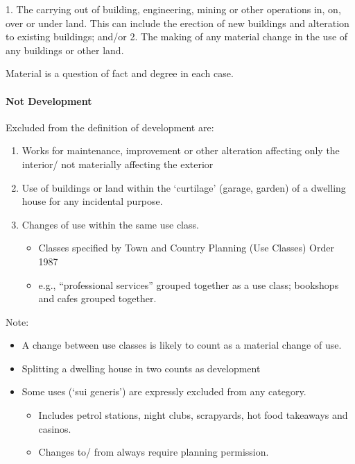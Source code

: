 \documentclass[
]{article}
\newenvironment{Shaded}{}{}
\newcommand{\NormalTok}[1]{#1}
\providecommand{\tightlist}{%
  \setlength{\itemsep}{0pt}\setlength{\parskip}{0pt}}
\begin{document}
\begin{Shaded}
\begin{Highlighting}[]
\NormalTok{1. The carrying out of building, engineering, mining or other operations in, on, over or under land. This can include the erection of new buildings and alteration to existing buildings; and/or}
\NormalTok{2. The making of any material change in the use of any buildings or other land.}
\end{Highlighting}
\end{Shaded}

Material is a question of fact and degree in each case.

\hypertarget{not-development}{%
\paragraph{Not Development}\label{not-development}}

Excluded from the definition of development are:

\begin{enumerate}
\def\labelenumi{\arabic{enumi}.}
\tightlist
\item
  Works for maintenance, improvement or other alteration affecting only
  the interior/ not materially affecting the exterior
\item
  Use of buildings or land within the `curtilage' (garage, garden) of a
  dwelling house for any incidental purpose.
\item
  Changes of use within the same use class.

  \begin{itemize}
  \tightlist
  \item
    Classes specified by Town and Country Planning (Use Classes) Order
    1987
  \item
    e.g., ``professional services'' grouped together as a use class;
    bookshops and cafes grouped together.
  \end{itemize}
\end{enumerate}

Note:

\begin{itemize}
\tightlist
\item
  A change between use classes is likely to count as a material change
  of use.
\item
  Splitting a dwelling house in two counts as development
\item
  Some uses (`sui generis') are expressly excluded from any category.

  \begin{itemize}
  \tightlist
  \item
    Includes petrol stations, night clubs, scrapyards, hot food
    takeaways and casinos.
  \item
    Changes to/ from always require planning permission.
  \end{itemize}
\end{itemize}
\end{document}
